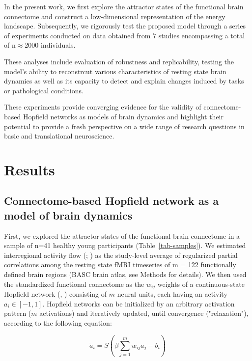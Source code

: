 \documentclass{article}
\begin{document}
In the present work, we first explore the attractor states of the functional brain connectome and construct a low-dimensional representation of the energy landscape.
Subsequently, we rigorously test the proposed model through a series of experiments conducted on data obtained from 7 studies encompassing a total of n$\approx$2000 individuals.

These analyses include evaluation of robustness and replicability, testing the model's ability to reconstrcut various characteristics of resting state brain dynamics as well as its capacity to detect and explain changes induced by tasks or pathological conditions.

These experiments provide converging evidence for the validity of connectome-based Hopfield networks as models of brain dynamics and highlight their potential to provide a fresh perspective on a wide range  of research questions in basic and translational neuroscience.

\section{Results}\label{Results}

\subsection{Connectome-based Hopfield network as a model of brain dynamics}\label{Connectome-based Hopfield network as a model of brain dynamics}

First, we explored the attractor states of the functional brain connectome in a sample of n=41 healthy young participants (Table~\ref{tab-samples}). We estimated interregional activity flow (\href{https://doi.org/10.1038/nn.4406}{}; \href{https://doi.org/10.1038/s41467-017-01000-w}{}) as the study-level average of regularized partial correlations among the resting state fMRI timeseries of m = 122 functionally defined brain regions (BASC brain atlas, see Methods for details). We then used the standardized functional connectome as the $w_{ij}$  weights of a continuous-state Hopfield network (\href{https://doi.org/10.1073/pnas.79.8.2554}{}, \href{https://doi.org/10.1162/neco.1994.6.3.459}{}) consisting of $m$ neural units, each having an activity $a_i \in [ -1,1]$. Hopfield networks can be initialized by an arbitrary activation pattern ($m$ activations) and iteratively updated, until convergence ("relaxation"), according to the following equation:

\begin{equation}
\label{hopfield-update}
\dot{a}_i = S(\beta \sum_{j=1}^m w_{ij}a_j - b_i)
\end{equation}
\end{document}
